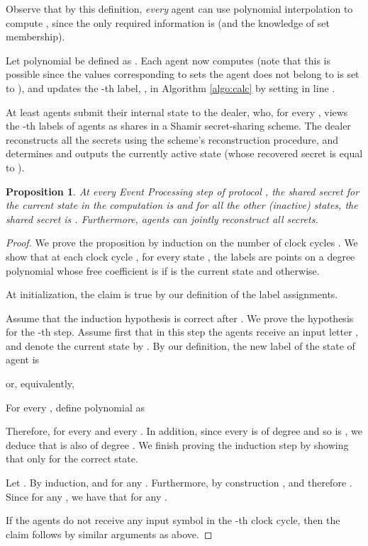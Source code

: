 \documentclass[letterpaper,11pt]{article}
\newtheorem{proposition}[theorem]{Proposition}
\begin{document}
Observe that by this definition, {\em every} agent  can use
polynomial interpolation to compute , since the only required
information is  (and the knowledge of set membership).

Let polynomial  be defined as
. Each agent  now computes 
 (note that this is possible since the values corresponding to
sets the agent does not belong to is set to ), and updates the 
-th label, , in Algorithm \ref{algo:calc} by 
setting  in line .

\vspace{.06in}
 At least  agents submit their 
internal state to the dealer, who, for every , views the
-th labels of  agents as shares in a Shamir secret-sharing
scheme. The dealer reconstructs all the  secrets using 
the scheme's reconstruction procedure, and determines and outputs the
currently active state (whose recovered secret is equal to ).



\begin{proposition}
\label{prop-threshold}
At every Event Processing step of protocol , the shared secret
for the current state in the computation is  and for all the other
(inactive) states, the shared secret is . Furthermore,  agents
can jointly reconstruct all secrets.
\end{proposition}

\begin {proof}
We prove the proposition by induction on the number of clock cycles . We show that at each clock cycle , for every state , the  labels  are points on a degree  polynomial  whose free coefficient is  if  is the current state and  otherwise.

At initialization, the 
claim is true by our definition of the label assignments. 

Assume that the induction hypothesis is correct after . We prove
the hypothesis for the -th step. Assume first that in this step the
agents receive an input letter , and denote the current
state by . By our definition, the new label of the state 
of agent  is


\noindent or, equivalently,


For every , define polynomial  as

Therefore,  for every  and every . In
addition, since every  is of degree  and so is , we deduce
that  is also of degree . We finish proving the induction step by
showing that  only for the correct state.

Let . By induction, 
and  for any . Furthermore, by construction
, and therefore . Since  for any
, we have that  for any .

If the agents do not receive any input symbol in the -th clock cycle, 
then 
the claim follows by similar arguments as above.
\end {proof}
\end{document}
